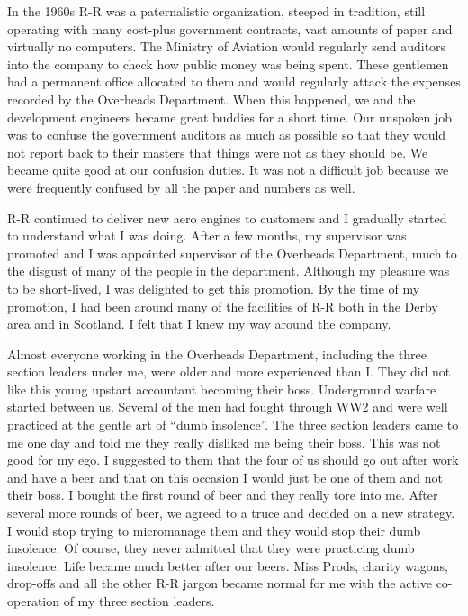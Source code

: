 In the 1960s R-R was a paternalistic organization, steeped in
tradition, still operating with many cost-plus government contracts,
vast amounts of paper and virtually no computers. The Ministry of
Aviation would regularly send auditors into the company to check how
public money was being spent. These gentlemen had a permanent office
allocated to them and would regularly attack the expenses recorded by
the Overheads Department. When this happened, we and the development
engineers became great buddies for a short time. Our unspoken job was
to confuse the government auditors as much as possible so that they
would not report back to their masters that things were not as they
should be. We became quite good at our confusion duties. It was not a
difficult job because we were frequently confused by all the paper and
numbers as well.

R-R continued to deliver new aero engines to customers and I gradually
started to understand what I was doing. After a few months, my
supervisor was promoted and I was appointed supervisor of the
Overheads Department, much to the disgust of many of the people in the
department. Although my pleasure was to be short-lived, I was
delighted to get this promotion. By the time of my promotion, I had
been around many of the facilities of R-R both in the Derby area and
in Scotland. I felt that I knew my way around the company.

Almost everyone working in the Overheads Department, including the
three section leaders under me, were older and more experienced than
I. They did not like this young upstart accountant becoming their
boss. Underground warfare started between us. Several of the men had
fought through WW2 and were well practiced at the gentle art of ``dumb
insolence''. The three section leaders came to me one day and told me
they really disliked me being their boss. This was not good for my
ego. I suggested to them that the four of us should go out after work
and have a beer and that on this occasion I would just be one of them
and not their boss. I bought the first round of beer and they really
tore into me. After several more rounds of beer, we agreed to a truce
and decided on a new strategy. I would stop trying to micromanage them
and they would stop their dumb insolence. Of course, they never
admitted that they were practicing dumb insolence. Life became much
better after our beers. Miss Prods, charity wagons, drop-offs and all
the other R-R jargon became normal for me with the active co-operation
of my three section leaders.

